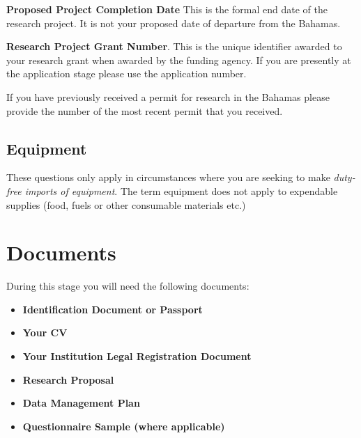 \documentclass[
]{book}
\providecommand{\tightlist}{%
  \setlength{\itemsep}{0pt}\setlength{\parskip}{0pt}}
\begin{document}
\textbf{Proposed Project Completion Date} This is the formal end date of the research project. It is not your proposed date of departure from the Bahamas.

\textbf{Research Project Grant Number}. This is the unique identifier awarded to your research grant when awarded by the funding agency. If you are presently at the application stage please use the application number.

If you have previously received a permit for research in the Bahamas please provide the number of the most recent permit that you received.

\hypertarget{equipment}{%
\section{Equipment}\label{equipment}}

These questions only apply in circumstances where you are seeking to make \emph{duty-free imports of equipment}. The term equipment does not apply to expendable supplies (food, fuels or other consumable materials etc.)

\hypertarget{documents}{%
\chapter{Documents}\label{documents}}

During this stage you will need the following documents:

\begin{itemize}
\tightlist
\item
  \textbf{Identification Document or Passport}
\item
  \textbf{Your CV}
\item
  \textbf{Your Institution Legal Registration Document}
\item
  \textbf{Research Proposal}
\item
  \textbf{Data Management Plan}
\item
  \textbf{Questionnaire Sample (where applicable)}
\end{itemize}
\end{document}
